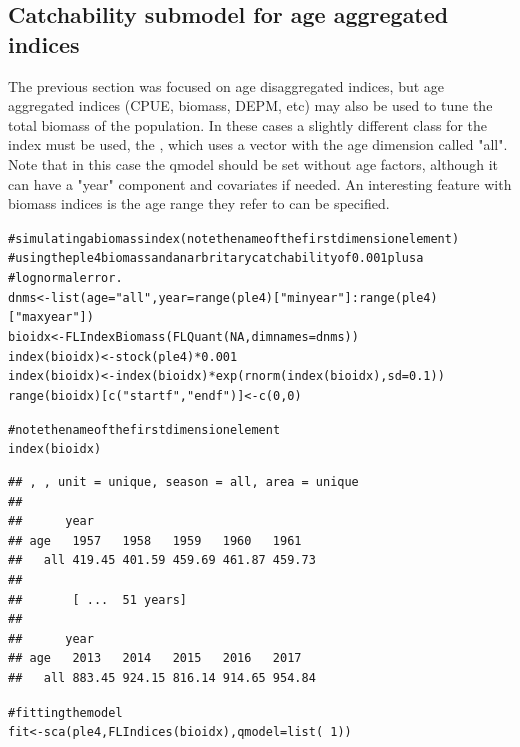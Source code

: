 \documentclass[a4paper,english,10pt]{article}\usepackage[]{graphicx}\usepackage[]{color}
\makeatletter
\newcommand{\hlnum}[1]{\textcolor[rgb]{0.063,0.58,0.627}{#1}}%
\newcommand{\hlstr}[1]{\textcolor[rgb]{0.063,0.58,0.627}{#1}}%
\newcommand{\hlcom}[1]{\textcolor[rgb]{0.588,0.588,0.588}{#1}}%
\newcommand{\hlopt}[1]{\textcolor[rgb]{0.196,0.196,0.196}{#1}}%
\newcommand{\hlstd}[1]{\textcolor[rgb]{0.196,0.196,0.196}{#1}}%
\newcommand{\hlkwb}[1]{\textcolor[rgb]{0.627,0,0.314}{#1}}%
\newcommand{\hlkwc}[1]{\textcolor[rgb]{0,0.631,0.314}{#1}}%
\newcommand{\hlkwd}[1]{\textcolor[rgb]{0.78,0.227,0.412}{#1}}%
\newenvironment{kframe}{%
 \def\at@end@of@kframe{}%
 \ifinner\ifhmode%
  \def\at@end@of@kframe{\end{minipage}}%
  \begin{minipage}{\columnwidth}%
 \fi\fi%
 \def\FrameCommand##1{\hskip\@totalleftmargin \hskip-\fboxsep
 \colorbox{shadecolor}{##1}\hskip-\fboxsep
     \hskip-\linewidth \hskip-\@totalleftmargin \hskip\columnwidth}%
 \MakeFramed {\advance\hsize-\width
   \@totalleftmargin\z@ \linewidth\hsize
   \@setminipage}}%
 {\par\unskip\endMakeFramed%
 \at@end@of@kframe}
\newenvironment{knitrout}{}{} %
\makeatother
\begin{document}
\subsection{Catchability submodel for age aggregated indices}

The previous section was focused on age disaggregated indices, but age aggregated indices (CPUE, biomass, DEPM, etc) may also be used to tune the total biomass of the population. In these cases a slightly different class for the index must be used, the , which uses a vector  with the age dimension called "all". Note that in this case the qmodel should be set without age factors, although it can have a "year" component and covariates if needed. An interesting feature with biomass indices is the age range they refer to can be specified.

\begin{knitrout}
\color{fgcolor}\begin{kframe}
\begin{alltt}
\hlcom{# simulating a biomass index (note the name of the first dimension element)}
\hlcom{# using the ple4 biomass and an arbritary catchability of 0.001 plus a}
\hlcom{# lognormal error.}
\hlstd{dnms} \hlkwb{<-} \hlkwd{list}\hlstd{(}\hlkwc{age} \hlstd{=} \hlstr{"all"}\hlstd{,} \hlkwc{year} \hlstd{=} \hlkwd{range}\hlstd{(ple4)[}\hlstr{"minyear"}\hlstd{]}\hlopt{:}\hlkwd{range}\hlstd{(ple4)[}\hlstr{"maxyear"}\hlstd{])}
\hlstd{bioidx} \hlkwb{<-} \hlkwd{FLIndexBiomass}\hlstd{(}\hlkwd{FLQuant}\hlstd{(}\hlnum{NA}\hlstd{,} \hlkwc{dimnames} \hlstd{= dnms))}
\hlkwd{index}\hlstd{(bioidx)} \hlkwb{<-} \hlkwd{stock}\hlstd{(ple4)} \hlopt{*} \hlnum{0.001}
\hlkwd{index}\hlstd{(bioidx)} \hlkwb{<-} \hlkwd{index}\hlstd{(bioidx)} \hlopt{*} \hlkwd{exp}\hlstd{(}\hlkwd{rnorm}\hlstd{(}\hlkwd{index}\hlstd{(bioidx),} \hlkwc{sd} \hlstd{=} \hlnum{0.1}\hlstd{))}
\hlkwd{range}\hlstd{(bioidx)[}\hlkwd{c}\hlstd{(}\hlstr{"startf"}\hlstd{,} \hlstr{"endf"}\hlstd{)]} \hlkwb{<-} \hlkwd{c}\hlstd{(}\hlnum{0}\hlstd{,} \hlnum{0}\hlstd{)}

\hlcom{# note the name of the first dimension element}
\hlkwd{index}\hlstd{(bioidx)}
\end{alltt}
\begin{verbatim}
## , , unit = unique, season = all, area = unique
## 
##      year
## age   1957   1958   1959   1960   1961  
##   all 419.45 401.59 459.69 461.87 459.73
## 
##       [ ...  51 years]
## 
##      year
## age   2013   2014   2015   2016   2017  
##   all 883.45 924.15 816.14 914.65 954.84
\end{verbatim}
\begin{alltt}
\hlcom{# fitting the model}
\hlstd{fit} \hlkwb{<-} \hlkwd{sca}\hlstd{(ple4,} \hlkwd{FLIndices}\hlstd{(bioidx),} \hlkwc{qmodel} \hlstd{=} \hlkwd{list}\hlstd{(}\hlopt{~}\hlnum{1}\hlstd{))}
\end{alltt}
\end{kframe}
\end{knitrout}
\end{document}
